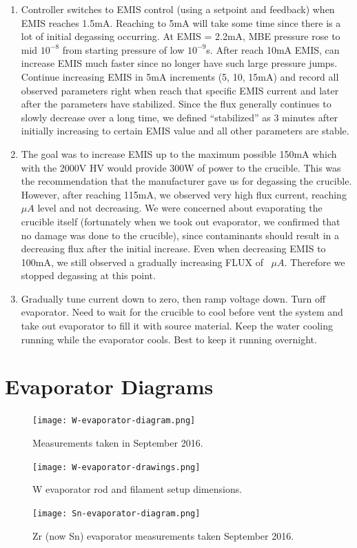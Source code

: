 \begin{enumerate}
\item	Controller switches to EMIS control (using a setpoint and feedback) when EMIS reaches 1.5mA.  Reaching to 5mA will take some time since there is a lot of initial degassing occurring. At EMIS = 2.2mA, MBE pressure rose to mid $10^{-8}$ from starting pressure of low $10^{-9}$s. After reach 10mA EMIS, can increase EMIS much faster since no longer have such large pressure jumps. Continue increasing EMIS in 5mA increments (5, 10, 15mA) and record all observed parameters right when reach that specific EMIS current and later after the parameters have stabilized. Since the flux generally continues to slowly decrease over a long time, we defined “stabilized” as 3 minutes after initially increasing to certain EMIS value and all other parameters are stable.
\item	The goal was to increase EMIS up to the maximum possible 150mA which with the 2000V HV would provide 300W of power to the crucible. This was the recommendation that the manufacturer gave us for degassing the crucible. However, after reaching 115mA, we observed very high flux current, reaching $\mu A$ level and not decreasing. We were concerned about evaporating the crucible itself (fortunately when we took out evaporator, we confirmed that no damage was done to the crucible), since contaminants should result in a decreasing flux after the initial increase. Even when decreasing EMIS to 100mA, we still observed a gradually increasing FLUX of ~$\mu A$.  Therefore we stopped degassing at this point.
\item	Gradually tune current down to zero, then ramp voltage down. Turn off evaporator. Need to wait for the crucible to cool before vent the system and take out evaporator to fill it with source material. Keep the water cooling running while the evaporator cools. Best to keep it running overnight.
\end{enumerate}

\section{Evaporator Diagrams}
\begin{figure}[H]
	\centering
	\texttt{[image: W-evaporator-diagram.png]} 
	\caption{Measurements taken in September 2016.}
	\label{fig:W-diagram}
\end{figure}

\begin{figure}[H]
	\centering
	\texttt{[image: W-evaporator-drawings.png]} 
	\caption{W evaporator rod and filament setup dimensions.}
	\label{fig:W-drawings}
\end{figure}

\begin{figure}[H]
	\centering
	\texttt{[image: Sn-evaporator-diagram.png]} 
	\caption{Zr (now Sn) evaporator measurements taken September 2016.}
	\label{fig:Sn-diagram}
\end{figure}


